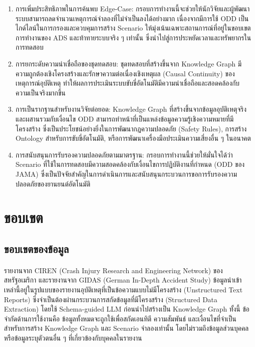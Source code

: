 \begin{enumerate}
    \item การเพิ่มประสิทธิภาพในการค้นพบ Edge-Case: กรอบการทำงานนี้จะช่วยให้นักวิจัยและผู้พัฒนาระบบสามารถลดจำนวนเหตุการณ์จำลองที่ไม่จำเป็นลงได้อย่างมาก เนื่องจากมีการใช้ ODD เป็นไกด์ไลน์ในการกรองและควบคุมการสร้าง Scenario ให้มุ่งเน้นเฉพาะสถานการณ์ที่อยู่ในขอบเขตการทำงานของ ADS และท้าทายระบบจริง ๆ เท่านั้น ซึ่งนำไปสู่การประหยัดเวลาและทรัพยากรในการทดสอบ
    \item การยกระดับความน่าเชื่อถือของชุดทดสอบ: ชุดทดสอบที่สร้างขึ้นจาก Knowledge Graph มีความถูกต้องเชิงโครงสร้างและรักษาความต่อเนื่องเชิงเหตุผล (Causal Continuity) ของเหตุการณ์อุบัติเหตุ ทำให้ผลการประเมินระบบขับขี่อัตโนมัติมีความน่าเชื่อถือและสอดคล้องกับความเป็นจริงมากขึ้น
    \item การเป็นรากฐานสำหรับงานวิจัยต่อยอด: Knowledge Graph ที่สร้างขึ้นจากข้อมูลอุบัติเหตุจริงและผสานรวมกับเงื่อนไข ODD สามารถทำหน้าที่เป็นแหล่งข้อมูลความรู้เชิงความหมายที่มีโครงสร้าง ซึ่งเป็นประโยชน์อย่างยิ่งในการพัฒนากฎความปลอดภัย (Safety Rules), การสร้าง Ontology สำหรับการขับขี่อัตโนมัติ, หรือการพัฒนาเครื่องมือประเมินความเสี่ยงอื่น ๆ ในอนาคต
    \item การสนับสนุนการรับรองความปลอดภัยตามมาตรฐาน: กรอบการทำงานนี้ช่วยให้มั่นใจได้ว่า Scenario ที่ใช้ในการทดสอบมีความสอดคล้องกับเงื่อนไขการปฏิบัติงานที่กำหนด (ODD ของ JAMA) ซึ่งเป็นปัจจัยสำคัญในการดำเนินการและสนับสนุนกระบวนการขอการรับรองความปลอดภัยของยานยนต์อัตโนมัติ
\end{enumerate}

\section{ขอบเขต}\label{sec:scope}

\subsection{ขอบเขตของข้อมูล}\label{subsec:data-scope}
\paragraph{}รายงานจาก CIREN (Crash Injury Research and Engineering Network) ของสหรัฐอเมริกา และรายงานจาก GIDAS (German In-Depth Accident Study) ข้อมูลนำเข้าเหล่านี้อยู่ในรูปแบบของรายงานอุบัติเหตุที่เป็นข้อความแบบไม่มีโครงสร้าง (Unstructured Text Reports) ซึ่งจำเป็นต้องผ่านกระบวนการสกัดข้อมูลที่มีโครงสร้าง (Structured Data Extraction) โดยใช้ Schema-guided LLM ก่อนนำไปสร้างเป็น Knowledge Graph ทั้งนี้ ข้อจำกัดด้านการใช้งานคือ ข้อมูลทั้งหมดจะถูกใช้เพื่อสกัดเอนทิตี ความสัมพันธ์ และเงื่อนไขที่จำเป็นสำหรับการสร้าง Knowledge Graph และ Scenario จำลองเท่านั้น โดยไม่รวมถึงข้อมูลส่วนบุคคลหรือข้อมูลระบุตัวตนอื่น ๆ ที่เกี่ยวข้องกับบุคคลในรายงาน

